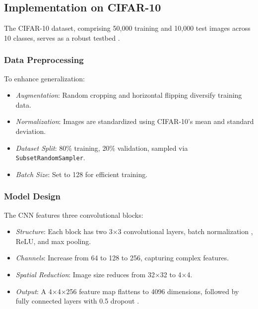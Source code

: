 \documentclass[UTF8]{report}
\theoremstyle{MyLineTheoremStyle} %
\theoremstyle{MyBlockTheoremStyle} %
\theoremstyle{MySubsubsectionStyle} %
\begin{document}
\subsection{Implementation on CIFAR-10}

The CIFAR-10 dataset, comprising 50,000 training and 10,000 test images across 10 classes, serves as a robust testbed \cite{cifar10}.

\subsubsection{Data Preprocessing}

To enhance generalization:

\begin{itemize}
    \item \textit{Augmentation}: Random cropping and horizontal flipping diversify training data.
    \item \textit{Normalization}: Images are standardized using CIFAR-10’s mean and standard deviation.
    \item \textit{Dataset Split}: 80\% training, 20\% validation, sampled via \texttt{SubsetRandomSampler}.
    \item \textit{Batch Size}: Set to 128 for efficient training.
\end{itemize}

\subsubsection{Model Design}

The CNN features three convolutional blocks:

\begin{itemize}
    \item \textit{Structure}: Each block has two 3$\times$3 convolutional layers, batch normalization \cite{batchnorm}, ReLU, and max pooling.
    \item \textit{Channels}: Increase from 64 to 128 to 256, capturing complex features.
    \item \textit{Spatial Reduction}: Image size reduces from 32$\times$32 to 4$\times$4.
    \item \textit{Output}: A 4$\times$4$\times$256 feature map flattens to 4096 dimensions, followed by fully connected layers with 0.5 dropout \cite{dropout}.
\end{itemize}
\end{document}
